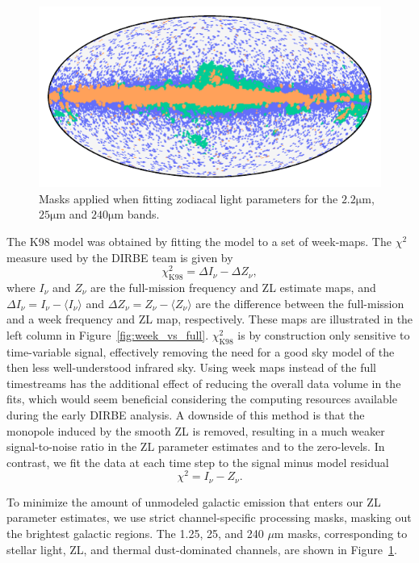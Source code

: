 \documentclass[twocolumn]{aa}
\begin{document}
\begin{figure}
    \centering
    \includegraphics[width=\columnwidth]{figs/mask_zodi_fitting.pdf}
    \caption{Masks applied when fitting zodiacal light parameters for 
    the $2.2\mathrm{\mu m}$, $25\mathrm{\mu m}$ and $240\mathrm{\mu m}$ 
    bands.}
    \label{fig:masks}
\end{figure}
The K98 model was obtained by fitting the model to a set of week-maps. 
The $\chi^2$ measure used by the DIRBE team is given by
\begin{equation}
    \chi^2_\mathrm{K98} = \Delta I_\nu - \Delta Z_\nu,
\end{equation}
where $I_\nu$ and $Z_\nu$ are the full-mission frequency and ZL estimate 
maps, and $\Delta I_\nu = I_\nu - \langle I_\nu \rangle$ and $\Delta Z_\nu = Z_\nu - \langle Z_\nu \rangle$ are the difference between 
the full-mission and a week frequency and ZL map, respectively. These 
maps are illustrated in the left column in Figure~\ref{fig:week_vs_full}. 
$\chi^2_\mathrm{K98}$ is by construction only sensitive to time-variable 
signal, effectively removing the need for a good sky model of the then 
less well-understood infrared sky. Using week maps instead of the full 
timestreams has the additional effect of reducing the overall data 
volume in the fits, which would seem beneficial considering the 
computing resources available during the early DIRBE analysis. A 
downside of this method is that the monopole induced by the smooth ZL is 
removed, resulting in a much weaker signal-to-noise ratio in the ZL 
parameter estimates and to the zero-levels. In contrast, we fit the data 
at each time step to the signal minus model residual
\begin{equation}\label{eq:chisq}
    \chi^2 = I_\nu - Z_\nu.
\end{equation}

To minimize the amount of unmodeled galactic emission that enters our 
ZL parameter estimates, we use strict channel-specific processing masks, 
masking out the brightest galactic regions. The 1.25, 25, and 240 $\mu$m 
masks, corresponding to stellar light, ZL, and thermal dust-dominated 
channels, are shown in Figure~\ref{fig:masks}.
\end{document}
